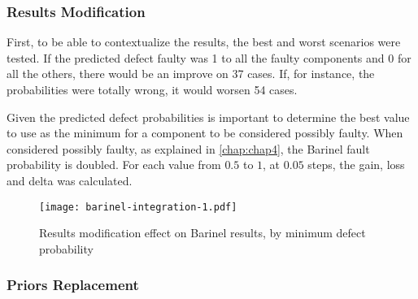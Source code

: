 \subsubsection{Results Modification}

First, to be able to contextualize the results, the best and worst scenarios were tested. If the predicted defect faulty was 1 to all the faulty components and 0 for all the others, there would be an improve on 37 cases. If, for instance, the probabilities were totally wrong, it would worsen 54 cases.

Given the predicted defect probabilities is important to determine the best value to use as the minimum for a component to be considered possibly faulty. When considered possibly faulty, as explained in \ref{chap:chap4}, the Barinel fault probability is doubled. For each value from $0.5$ to $1$, at $0.05$ steps, the gain, loss and delta was calculated.
%
\begin{figure}[H]
  \begin{center}
    \leavevmode
    \texttt{[image: barinel-integration-1.pdf]}
    \caption{Results modification effect on Barinel results, by minimum defect probability}
    \label{fig:results-modification}
  \end{center}
\end{figure}


\subsubsection{Priors Replacement}




